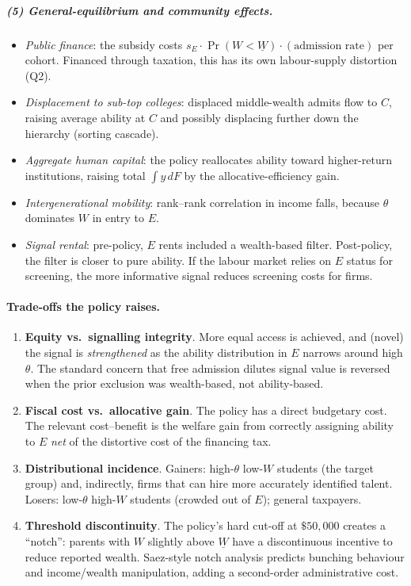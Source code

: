 \documentclass[11pt,a4paper]{article}
\begin{document}
\subparagraph{(5) General-equilibrium and community effects.}
\begin{itemize}[leftmargin=*,itemsep=2pt]
    \item \emph{Public finance}: the subsidy costs $s_{E}\cdot\Pr(W<\underline W)\cdot(\text{admission rate})$ per cohort. Financed through taxation, this has its own labour-supply distortion (Q2).
    \item \emph{Displacement to sub-top colleges}: displaced middle-wealth admits flow to $C$, raising average ability at $C$ and possibly displacing further down the hierarchy (sorting cascade).
    \item \emph{Aggregate human capital}: the policy reallocates ability toward higher-return institutions, raising total $\int y\,dF$ by the allocative-efficiency gain.
    \item \emph{Intergenerational mobility}: rank--rank correlation in income falls, because $\theta$ dominates $W$ in entry to $E$.
    \item \emph{Signal rental}: pre-policy, $E$ rents included a wealth-based filter. Post-policy, the filter is closer to pure ability. If the labour market relies on $E$ status for screening, the more informative signal reduces screening costs for firms.
\end{itemize}

\paragraph{Trade-offs the policy raises.}
\begin{enumerate}[leftmargin=*,itemsep=2pt]
    \item \textbf{Equity vs.\ signalling integrity}. More equal access is achieved, and (novel) the signal is \emph{strengthened} as the ability distribution in $E$ narrows around high $\theta$. The standard concern that free admission dilutes signal value is reversed when the prior exclusion was wealth-based, not ability-based.
    \item \textbf{Fiscal cost vs.\ allocative gain}. The policy has a direct budgetary cost. The relevant cost--benefit is the welfare gain from correctly assigning ability to $E$ \emph{net} of the distortive cost of the financing tax.
    \item \textbf{Distributional incidence}. Gainers: high-$\theta$ low-$W$ students (the target group) and, indirectly, firms that can hire more accurately identified talent. Losers: low-$\theta$ high-$W$ students (crowded out of $E$); general taxpayers.
    \item \textbf{Threshold discontinuity}. The policy's hard cut-off at $\$50{,}000$ creates a ``notch'': parents with $W$ slightly above $\underline W$ have a discontinuous incentive to reduce reported wealth. Saez-style notch analysis predicts bunching behaviour and income/wealth manipulation, adding a second-order administrative cost.
\end{enumerate}
\end{document}
